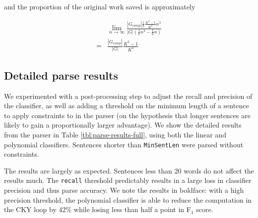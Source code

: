 \documentclass[11pt]{article}
\begin{document}
and the proportion of the original work saved is approximately

\begin{equation*}
\begin{split}
& \lim_{n \to \infty}\frac{|G_{comp}|\frac{1}{6}\frac{K^2-1}{K^2}n^3}{|G|(\frac{1}{6}n^3 - \frac{1}{6}n)}\\
=& \frac{|G_{comp}|}{|G|}\frac{K^2-1}{K^2}
\end{split}
\end{equation*}


\subsection{Detailed parse results}
\label{sec-8-2}

We experimented with a post-processing step to adjust the recall and precision of the classifier, as well as
adding a threshold on the minimum length of a sentence to apply constraints to in the parser (on the hypothesis
that longer sentences are likely to gain a proportionally larger advantage). We show the detailed results from
the parser in Table \ref{tbl:parse-results-full}, using both the linear and polynomial classifiers. Sentences
shorter than \texttt{MinSentLen} were parsed without constraints.

The results are largely as expected. Sentences less than 20 words do not affect the results much. The \texttt{recall} threshold
predictably results in a large loss in classifier precision and thus parse accuracy. We note the results in
boldface: with a high precision threshold, the polynomial classifier is able to reduce the computation in the CKY loop
by 42\% while losing less than half a point in F$_{\text{1}}$ score.
\end{document}

